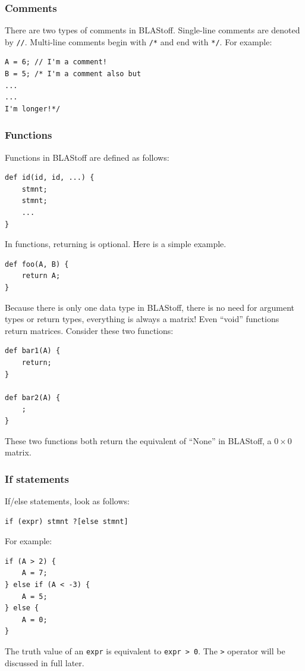 \subsubsection{Comments}
There are two types of comments in BLAStoff.  Single-line comments are denoted by \verb=//=.  Multi-line comments begin with  \verb=/*= and end with \verb=*/=.  For example:
\begin{lstlisting}
A = 6; // I'm a comment!
B = 5; /* I'm a comment also but
...
...
I'm longer!*/
\end{lstlisting}

\subsubsection{Functions}
Functions in BLAStoff are defined as follows:
\begin{lstlisting}
def id(id, id, ...) {
    stmnt;
    stmnt;
    ...
}
\end{lstlisting}
In functions, returning is optional.  Here is a simple example.
\begin{lstlisting}
def foo(A, B) {
    return A;
}
\end{lstlisting}
Because there is only one data type in BLAStoff, there is no need for argument types or return types, everything is always a matrix!  Even ``void'' functions return matrices.  Consider these two functions:

\begin{lstlisting}
def bar1(A) {
    return;
}

def bar2(A) {
    ;
}
\end{lstlisting}
These two functions both return the equivalent of ``None'' in BLAStoff, a $0\times 0$ matrix.

\subsubsection{If statements}
If/else statements, look as follows:
\begin{lstlisting}
if (expr) stmnt ?[else stmnt]
\end{lstlisting}

For example:
\begin{lstlisting}
if (A > 2) {
    A = 7;
} else if (A < -3) {
    A = 5;
} else {
    A = 0;
}
\end{lstlisting}

The truth value of an \verb=expr= is equivalent to \verb=expr > 0=.  The \verb=>= operator will be discussed in full later.

